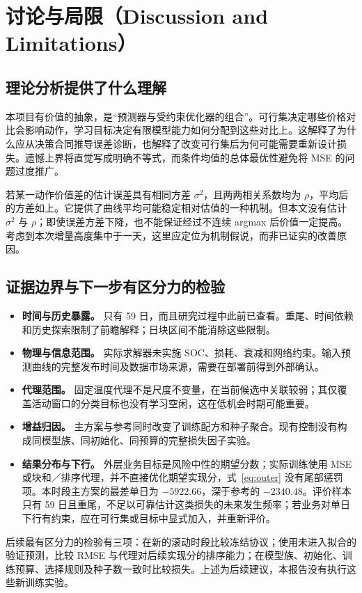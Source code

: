 \documentclass[11pt,a4paper]{article}
\begin{document}
\section{讨论与局限（Discussion and Limitations）}
\subsection{理论分析提供了什么理解}
本项目有价值的抽象，是“预测器与受约束优化器的组合”。可行集决定哪些价格对比会影响动作，学习目标决定有限模型能力如何分配到这些对比上。这解释了为什么应从决策合同推导误差诊断，也解释了改变可行集后为何可能需要重新设计损失。遗憾上界将直觉写成明确不等式，而条件均值的总体最优性避免将 MSE 的问题过度推广。

\EqVariance
若某一动作价值差的估计误差具有相同方差 $\sigma^2$，且两两相关系数均为 $\rho$，平均后的方差如上。它提供了曲线平均可能稳定相对估值的一种机制。但本文没有估计 $\sigma^2$ 与 $\rho$；即使误差方差下降，也不能保证经过不连续 argmax 后价值一定提高。考虑到本次增量高度集中于一天，这里应定位为机制假说，而非已证实的改善原因。

\subsection{证据边界与下一步有区分力的检验}
\begin{itemize}
\item \textbf{时间与历史暴露。} 只有 59 日，而且研究过程中此前已查看。重尾、时间依赖和历史探索限制了前瞻解释；日块区间不能消除这些限制。
\item \textbf{物理与信息范围。} 实际求解器未实施 SOC、损耗、衰减和网络约束。输入预测曲线的完整发布时间及数据市场来源，需要在部署前得到外部确认。
\item \textbf{代理范围。} 固定温度代理不是尺度不变量，在当前候选中关联较弱；其仅覆盖活动窗口的分类目标也没有学习空闲，这在低机会时期可能重要。
\item \textbf{增益归因。} 主方案与参考同时改变了训练配方和种子聚合。现有控制没有构成同模型族、同初始化、同预算的完整损失因子实验。
\item \textbf{结果分布与下行。} 外层业务目标是风险中性的期望分数；实际训练使用 MSE 或块和／排序代理，并不直接优化期望实现分，式~\eqref{eq:outer} 没有尾部惩罚项。本时段主方案的最差单日为 $-5922.66$，深于参考的 $-2340.48$。评价样本只有 59 日且重尾，不足以可靠估计这类损失的未来发生频率；若业务对单日下行有约束，应在可行集或目标中显式加入，并重新评价。
\end{itemize}
后续最有区分力的检验有三项：在新的滚动时段比较冻结协议；使用未进入拟合的验证预测，比较 RMSE 与代理对后续实现分的排序能力；在模型族、初始化、训练预算、选择规则及种子数一致时比较损失。上述为后续建议，本报告没有执行这些新训练实验。
\end{document}
